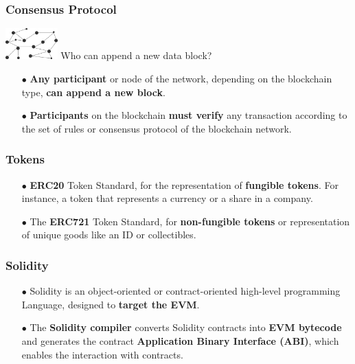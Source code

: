 \documentclass{beamer}
\begin{document}
\begin{frame}
	\frametitle{Consensus Protocol}
	\includegraphics[width=0.15\textwidth,right]{bc}
	Who can append a new data block?\linebreak
	\begin{itemize}
		\item[$\bullet$] \textbf{Any participant} or node of the network, depending on the blockchain type, \textbf{can append a new block}.\linebreak
		\item[$\bullet$] \textbf{Participants} on the blockchain \textbf{must verify} any transaction according to the set of rules or consensus protocol of the blockchain network.
	\end{itemize}				
\end{frame}
\begin{frame}
	\frametitle{Tokens}
	\begin{itemize}
		\item[$\bullet$] \textbf{ERC20} Token Standard, for the representation of \textbf{fungible tokens}. For instance, a token that represents a currency or a share in a company. 
		\linebreak
		\linebreak
		\item[$\bullet$] The \textbf{ERC721} Token Standard, for \textbf{non-fungible tokens} or representation of unique goods like an ID or collectibles.  
	\end{itemize}
\end{frame}

\begin{frame}
	\frametitle{Solidity}
	\begin{itemize}
		\item[$\bullet$]  Solidity is an object-oriented or contract-oriented high-level programming Language, designed to \textbf{target the EVM}.
		\item[$\bullet$] The \textbf{Solidity compiler} converts Solidity contracts into \textbf{EVM bytecode} and generates the contract \textbf{Application Binary Interface (ABI)}, which enables the interaction with contracts.
	\end{itemize}
\end{frame}
\end{document}
